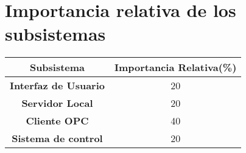 \documentclass[]{scrreprt}
\begin{document}
\chapter{Importancia relativa de los subsistemas}
\begin{table}[h]
\centering
\begin{tabular}{|c|c|}
\hline
\textbf{Subsistema}          & \multicolumn{1}{l|}{\textbf{Importancia Relativa(\%)}} \\ \hline
\textbf{Interfaz de Usuario} & 20                                                 \\ \hline
\textbf{Servidor Local}      & 20                                                 \\ \hline
\textbf{Cliente OPC}         & 40                                                 \\ \hline
\textbf{Sistema de control}  & 20                                                 \\ \hline
\end{tabular}
\end{table}
\end{document}

